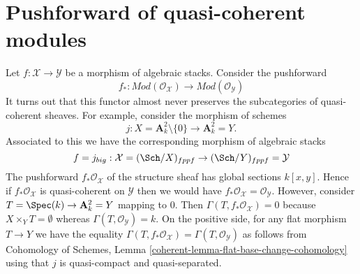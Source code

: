\section{Pushforward of quasi-coherent modules}
\label{section-pushforward-quasi-coherent}

\noindent
Let $f : \mathcal{X} \to \mathcal{Y}$ be a morphism of algebraic stacks.
Consider the pushforward
$$
f_* :
\textit{Mod}(\mathcal{O}_\mathcal{X})
\longrightarrow
\textit{Mod}(\mathcal{O}_\mathcal{Y})
$$
It turns out that this functor almost never preserves the subcategories
of quasi-coherent sheaves. For example, consider the morphism of schemes
$$
j : X = \mathbf{A}^2_k \setminus \{0\} \longrightarrow \mathbf{A}^2_k = Y.
$$
Associated to this we have the corresponding morphism of algebraic stacks
$$
f = j_{big} : \mathcal{X} = (\Sch/X)_{fppf} \to
(\Sch/Y)_{fppf} = \mathcal{Y}
$$
The pushforward $f_*\mathcal{O}_\mathcal{X}$ of the structure sheaf has
global sections $k[x, y]$. Hence if $f_*\mathcal{O}_\mathcal{X}$ is
quasi-coherent on $\mathcal{Y}$ then we would have
$f_*\mathcal{O}_\mathcal{X} = \mathcal{O}_\mathcal{Y}$. However,
consider $T = \Spec(k) \to \mathbf{A}^2_k = Y$ mapping to $0$.
Then $\Gamma(T, f_*\mathcal{O}_\mathcal{X}) = 0$ because
$X \times_Y T = \emptyset$ whereas $\Gamma(T, \mathcal{O}_\mathcal{Y}) = k$.
On the positive side, for any flat morphism $T \to Y$ we have the equality
$\Gamma(T, f_*\mathcal{O}_\mathcal{X}) = \Gamma(T, \mathcal{O}_\mathcal{Y})$
as follows from
Cohomology of Schemes, Lemma \ref{coherent-lemma-flat-base-change-cohomology}
using that $j$ is quasi-compact and quasi-separated.

